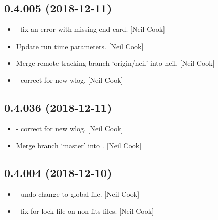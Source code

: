 \documentclass[a4paper,10pt,english]{report}
\begin{document}
\subsection{0.4.005 (2018-12-11)}
\label{\detokenize{misc/changelog:id238}}\begin{itemize}
\item {} 
 - fix an error with missing end card. {[}Neil Cook{]}

\item {} 
Update  run time parameters. {[}Neil Cook{]}

\item {} 
Merge remote-tracking branch ‘origin/neil’ into neil. {[}Neil Cook{]}

\item {} 
 - correct  for new wlog. {[}Neil
Cook{]}

\end{itemize}


\subsection{0.4.036 (2018-12-11)}
\label{\detokenize{misc/changelog:id239}}\begin{itemize}
\item {} 
 - correct  for new wlog. {[}Neil
Cook{]}

\item {} 
Merge branch ‘master’ into . {[}Neil Cook{]}

\end{itemize}


\subsection{0.4.004 (2018-12-10)}
\label{\detokenize{misc/changelog:id240}}\begin{itemize}
\item {} 
 - undo change to global file. {[}Neil Cook{]}

\item {} 
 - fix for lock file on non-fits files. {[}Neil Cook{]}

\end{itemize}
\end{document}

